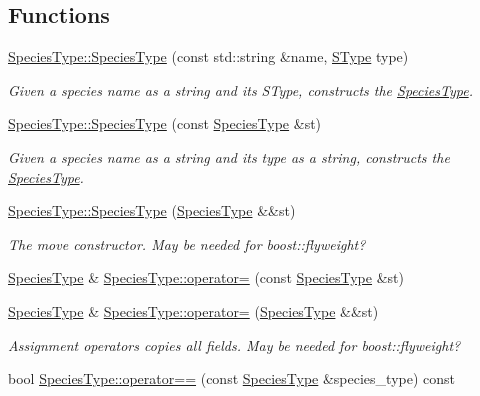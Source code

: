 \subsection*{Functions}
\begin{DoxyCompactItemize}
\item 
\hyperlink{group__Chemistry_ga57cabe9d486b2b79251a3a3ebcf97424}{Species\-Type\-::\-Species\-Type} (const std\-::string \&name, \hyperlink{group__Chemistry_ga49104ff0a7d4118feb179c2f1c906f12}{S\-Type} type)
\begin{DoxyCompactList}\small\item\em Given a species name as a string and its S\-Type, constructs the \hyperlink{classSpeciesType}{Species\-Type}. \end{DoxyCompactList}\item 
\hyperlink{group__Chemistry_ga32cbd03ba76d974b223fcc0e5f06b2dc}{Species\-Type\-::\-Species\-Type} (const \hyperlink{classSpeciesType}{Species\-Type} \&st)
\begin{DoxyCompactList}\small\item\em Given a species name as a string and its type as a string, constructs the \hyperlink{classSpeciesType}{Species\-Type}. \end{DoxyCompactList}\item 
\hyperlink{group__Chemistry_ga93c454d0c3a9677f44d1f4eb1ccc221d}{Species\-Type\-::\-Species\-Type} (\hyperlink{classSpeciesType}{Species\-Type} \&\&st)
\begin{DoxyCompactList}\small\item\em The move constructor. May be needed for boost\-::flyweight? \end{DoxyCompactList}\item 
\hyperlink{classSpeciesType}{Species\-Type} \& \hyperlink{group__Chemistry_ga2235490067a0ea21ab44c04b29897a67}{Species\-Type\-::operator=} (const \hyperlink{classSpeciesType}{Species\-Type} \&st)
\item 
\hyperlink{classSpeciesType}{Species\-Type} \& \hyperlink{group__Chemistry_ga0f1e812825b343f031f87de4feac68c7}{Species\-Type\-::operator=} (\hyperlink{classSpeciesType}{Species\-Type} \&\&st)
\begin{DoxyCompactList}\small\item\em Assignment operators copies all fields. May be needed for boost\-::flyweight? \end{DoxyCompactList}\item 
bool \hyperlink{group__Chemistry_ga68c675472ea526cab4abdd5b32fb486f}{Species\-Type\-::operator==} (const \hyperlink{classSpeciesType}{Species\-Type} \&species\-\_\-type) const 

\end{DoxyCompactItemize}
